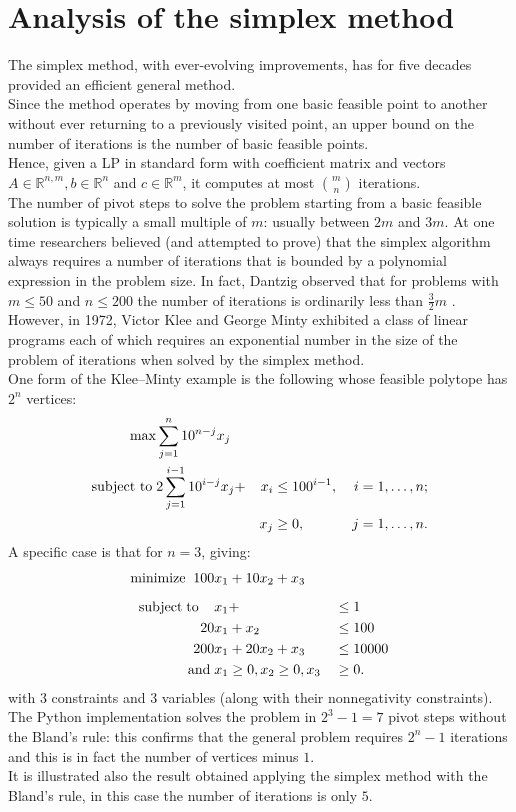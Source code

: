 \documentclass[a4paper,10 pt,titlepage,twoside]{book}
\theoremstyle{plain}
\theoremstyle{definition}
\theoremstyle{remark}
\begin{document}
 \section{Analysis of the simplex method}
The simplex method, with ever-evolving improvements, has for five decades provided an efficient general
method. \\
 Since the method operates by moving from one basic feasible point
to another without ever returning to a previously visited point, an upper bound
on the number of iterations is the number of basic feasible points.\\Hence, given a LP in standard form with
coefficient matrix and vectors $A\in\mathbb{R}^{n,m}, b\in\mathbb{R}^{n}$ and $c\in\mathbb{R}^{m}$, it computes at most $m\choose n$ iterations.\\
The number of pivot steps to solve
the problem starting from a basic feasible solution is typically a small multiple of
$m$: usually between $2m$ and $3m$. At one time researchers believed (and attempted to prove) that the simplex
algorithm always requires a number of iterations that is
bounded by a polynomial expression in the problem size. In fact, Dantzig observed that for problems with
$m \leq 50$ and $n \leq 200$ the number of iterations is ordinarily less than $\frac{3}{2}m$ \cite{DAN}.
\\ However, in 1972, Victor Klee and George Minty exhibited a class of linear programs each of which requires an
exponential number in the size of the problem of iterations when solved by the simplex method.\\
One form of the Klee–Minty example is the following whose feasible polytope has $2^{n}$
vertices:
\begin{alignat*}{4}
\max &\sum_{j=1}^{n}10^{n-j}x_{j}&&&\\
\text{subject to\;}&2\sum_{j=1}^{i-1}10^{i-j}x_{j}+&x_{i}&\leq 100^{i-1}, \, &i = 1,\dots, n;\\
&&x_{j}&\geq 0, \,&j = 1,\dots, n.\\
\end{alignat*}
A specific case is that for $n = 3$, giving:
\begin{alignat*}{2}
\text{minimize\;}\; 100& x_1+10x_2+ x_3&&\\[2mm]
\text{subject\;to\;\;\;\;} &x_1+&&\leq 1\\
						20& x_1+x_2&&\leq 100\\
200 &x_1 +20x_2 +x_{3}&&\leq 10000\\
\text{and}\;& x_1\geq 0,x_2\geq 0,x_3&&\geq 0.
\end{alignat*}
with 3 constraints and 3 variables (along with their nonnegativity constraints).\\
The Python implementation solves the problem in $2^{3} - 1 = 7$ pivot steps without the Bland's rule: this confirms that the general problem requires $2^{n}- 1$ iterations and this is in fact
the number of vertices minus $1$.\cite{MINTY}\\ It is illustrated also the result obtained applying the simplex method with the Bland's rule, in this case the number of iterations is only $5$.  \\
\end{document}
